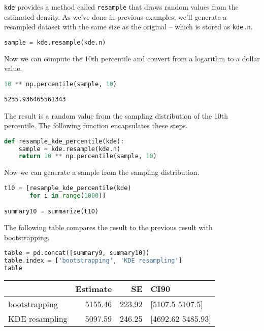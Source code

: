 \passthrough{\lstinline!kde!} provides a method called
\passthrough{\lstinline!resample!} that draws random values from the
estimated density. As we've done in previous examples, we'll generate a
resampled dataset with the same size as the original -- which is stored
as \passthrough{\lstinline!kde.n!}.

\begin{lstlisting}[language=Python,style=source]
sample = kde.resample(kde.n)
\end{lstlisting}

Now we can compute the 10th percentile and convert from a logarithm to a
dollar value.

\begin{lstlisting}[language=Python,style=source]
10 ** np.percentile(sample, 10)
\end{lstlisting}

\begin{lstlisting}[style=output]
5235.936465561343
\end{lstlisting}

The result is a random value from the sampling distribution of the 10th
percentile. The following function encapsulates these steps.

\begin{lstlisting}[language=Python,style=source]
def resample_kde_percentile(kde):
    sample = kde.resample(kde.n)
    return 10 ** np.percentile(sample, 10)
\end{lstlisting}

Now we can generate a sample from the sampling distribution.

\begin{lstlisting}[language=Python,style=source]
t10 = [resample_kde_percentile(kde)
       for i in range(1000)]

summary10 = summarize(t10)
\end{lstlisting}

The following table compares the result to the previous result with
bootstrapping.

\begin{lstlisting}[language=Python,style=source]
table = pd.concat([summary9, summary10])
table.index = ['bootstrapping', 'KDE resampling']
table
\end{lstlisting}

\begin{tabular}{lrrl}
\toprule
 & Estimate & SE & CI90 \\
\midrule
bootstrapping & 5155.46 & 223.92 & [5107.5 5107.5] \\
KDE resampling & 5097.59 & 246.25 & [4692.62 5485.93] \\
\bottomrule
\end{tabular}

